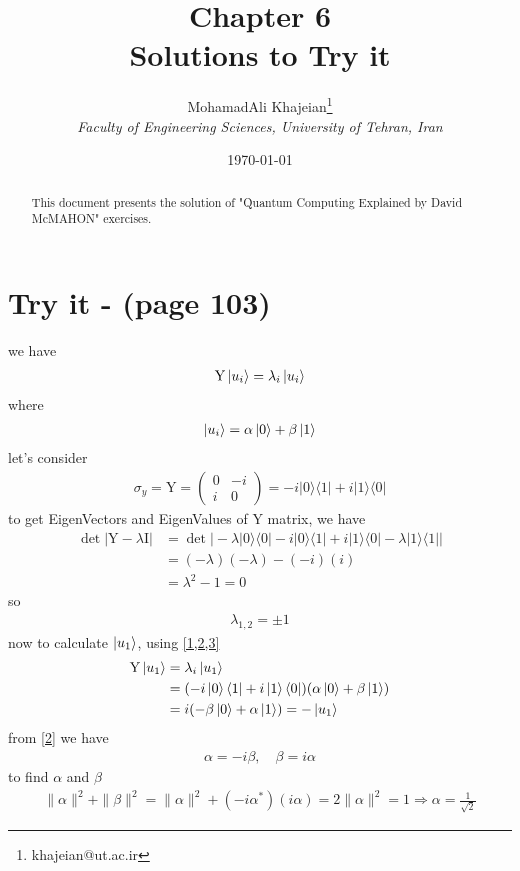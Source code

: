 \documentclass{article}
\title{\textbf{Chapter 6} \\ \small Solutions to Try it}
\author{
    MohamadAli Khajeian\footnote{khajeian@ut.ac.ir} \\ 
    \small \textit{Faculty of Engineering Sciences, University of Tehran, Iran} \\ 
}
\date{\today}
\newcommand{\op}[2]{|#1\rangle \langle#2|}
\begin{document}
\maketitle

\begin{abstract}
    This document presents the solution of "Quantum Computing Explained by David McMAHON" exercises.
\end{abstract}

\section*{Try it - (page 103)}
we have
\begin{align}
   \text{Y} \ket{u_i} = \lambda_i \ket{u_i}
   \label{1}
\end{align}
where 
\begin{align}
   \ket{u_i} = \alpha \ket{0} + \beta \ket{1}
   \label{2}
\end{align}
let's consider
\begin{align}
   \sigma_y = \text{Y} = 
   \begin{pmatrix}
      0 & -i \\
      i & 0 
   \end{pmatrix}
   = -i\op{0}{1} + i\op{1}{0}
   \label{3}
\end{align}
to get EigenVectors and EigenValues of $\text{Y}$ matrix, we have
\begin{align*}
   \det|\text{Y} - \lambda\text{I}| &= \det\bigg|-\lambda\op{0}{0}-i\op{0}{1} + i\op{1}{0}-\lambda\op{1}{1}\bigg| \\
   &= (-\lambda)(-\lambda) - (-i)(i) \\
   &= \lambda^2 - 1 = 0
\end{align*}
so
\begin{align*}
   \lambda_{1,2} = \pm 1
\end{align*}
now to calculate $\ket{u_1}$, using \cref{1,2,3}
\begin{align*}
   \text{Y} \ket{u_1} &= \lambda_i \ket{u_1} \\
   &=(-i\ket{0}\bra{1} + i\ket{1}\bra{0})(\alpha\ket{0}+\beta\ket{1}) \\
   &= i(-\beta\ket{0}+\alpha\ket{1}) = -\ket{u_1}
\end{align*}
from \ref{2} we have
\begin{align*}
    \alpha = -i\beta, \quad \beta = i\alpha
\end{align*}
to find $\alpha$ and $\beta$
\begin{align*}
    \|\alpha\|^2 + \|\beta\|^2 = \|\alpha\|^2 + (-i\alpha^{*})(i\alpha) = 2\|\alpha\|^2 = 1 \Longrightarrow \alpha = \frac{1}{\sqrt{2}}
\end{align*}
\end{document}

